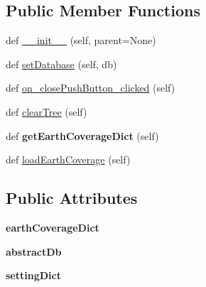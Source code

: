 \subsection*{Public Member Functions}
\begin{DoxyCompactItemize}
\item 
def \mbox{\hyperlink{class_dsg_tools_1_1_custom_widgets_1_1earth_coverage_widget_1_1_earth_coverage_widget_a51fc49d4a0bd276824ae6f609376043a}{\+\_\+\+\_\+init\+\_\+\+\_\+}} (self, parent=None)
\item 
def \mbox{\hyperlink{class_dsg_tools_1_1_custom_widgets_1_1earth_coverage_widget_1_1_earth_coverage_widget_a2c3d961e820803bc1ac33bad89d0c189}{set\+Database}} (self, db)
\item 
def \mbox{\hyperlink{class_dsg_tools_1_1_custom_widgets_1_1earth_coverage_widget_1_1_earth_coverage_widget_a6dfd220814ce5df81f1220c2ba934443}{on\+\_\+close\+Push\+Button\+\_\+clicked}} (self)
\item 
def \mbox{\hyperlink{class_dsg_tools_1_1_custom_widgets_1_1earth_coverage_widget_1_1_earth_coverage_widget_acea59db26fb435134def62d1c512035b}{clear\+Tree}} (self)
\item 
\mbox{\label{class_dsg_tools_1_1_custom_widgets_1_1earth_coverage_widget_1_1_earth_coverage_widget_a1392431fca97b499ace690404d8e9cd6}} 
def {\bfseries get\+Earth\+Coverage\+Dict} (self)
\item 
def \mbox{\hyperlink{class_dsg_tools_1_1_custom_widgets_1_1earth_coverage_widget_1_1_earth_coverage_widget_a5b831b9c59fd2b0601fc53e17b1df56a}{load\+Earth\+Coverage}} (self)
\end{DoxyCompactItemize}
\subsection*{Public Attributes}
\begin{DoxyCompactItemize}
\item 
\mbox{\label{class_dsg_tools_1_1_custom_widgets_1_1earth_coverage_widget_1_1_earth_coverage_widget_a2e24fae750cbbe424fdcd59558148f17}} 
{\bfseries earth\+Coverage\+Dict}
\item 
\mbox{\label{class_dsg_tools_1_1_custom_widgets_1_1earth_coverage_widget_1_1_earth_coverage_widget_aa8969a0414f2b5793565f41ed61dcf0f}} 
{\bfseries abstract\+Db}
\item 
\mbox{\label{class_dsg_tools_1_1_custom_widgets_1_1earth_coverage_widget_1_1_earth_coverage_widget_aa2ddd1eb89c7d325995739aad1656dca}} 
{\bfseries setting\+Dict}
\end{DoxyCompactItemize}


